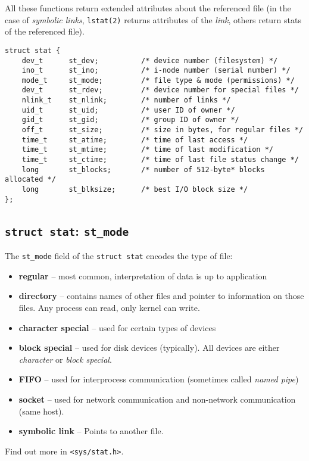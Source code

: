 \documentclass[xga]{xdvislides}
\begin{document}
All these functions return extended attributes about the referenced file (in
the case of {\em symbolic links}, {\tt lstat(2)} returns attributes of the
{\em link}, others return stats of the referenced file).
\vspace{.25in}
\small
\begin{verbatim}
struct stat {
    dev_t      st_dev;          /* device number (filesystem) */
    ino_t      st_ino;          /* i-node number (serial number) */
    mode_t     st_mode;         /* file type & mode (permissions) */
    dev_t      st_rdev;         /* device number for special files */
    nlink_t    st_nlink;        /* number of links */
    uid_t      st_uid;          /* user ID of owner */
    gid_t      st_gid;          /* group ID of owner */
    off_t      st_size;         /* size in bytes, for regular files */
    time_t     st_atime;        /* time of last access */
    time_t     st_mtime;        /* time of last modification */
    time_t     st_ctime;        /* time of last file status change */
    long       st_blocks;       /* number of 512-byte* blocks allocated */
    long       st_blksize;      /* best I/O block size */
};
\end{verbatim}
\Normalsize

\subsection{{\tt struct stat}: {\tt st\_mode}}

The {\tt st\_mode} field of the {\tt struct stat} encodes the type of file:

\begin{itemize}
	\item {\bf regular} -- most common, interpretation of data is up to
		application
	\item {\bf directory} -- contains names of other files and pointer to
		information on those files. Any process can read, only kernel
		can write.
	\item {\bf character special} -- used for certain types of devices
	\item {\bf block special} -- used for disk devices (typically). All
		devices are either {\em character} or {\em block special}.
	\item {\bf FIFO} -- used for interprocess communication
		(sometimes called {\em named pipe})
	\item {\bf socket} -- used for network communication and non-network
		communication (same host).
	\item {\bf symbolic link} -- Points to another file.
\end{itemize}
\vspace{.25in}
Find out more in {\tt <sys/stat.h>}.
\end{document}
